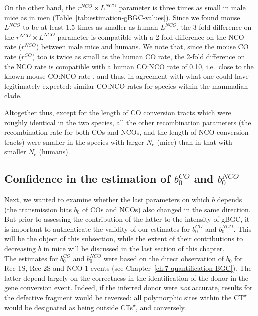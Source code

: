 On the other hand, the $r^{NCO} \times L^{NCO}$ parameter is three times as small in male mice as in men (Table~\ref{tab:estimation-gBGC-values}).
Since we found mouse $L^{NCO}$ to be at least 1.5 times as smaller as human $L^{NCO}$, the 3-fold difference on the $r^{NCO} \times L^{NCO}$ parameter is compatible with a 2-fold difference on the NCO rate ($r^{NCO}$) between male mice and humans.
We note that, since the mouse CO rate ($r^{CO}$) too is twice as small as the human CO rate, the 2-fold difference on the NCO rate is compatible with a human CO:NCO rate of 0.10, i.e.\ close to the known mouse CO:NCO rate \citep{cole2010comprehensive}, and thus, in agreement with what one could have legitimately expected: similar CO:NCO rates for species within the mammalian clade.

Altogether thus, except for the length of CO conversion tracts which were roughly identical in the two species, all the other recombination parameters (the recombination rate for both COs and NCOs, and the length of NCO conversion tracts) were smaller in the species with larger $N_e$ (mice) than in that with smaller $N_e$ (humans).






\subsection{Confidence in the estimation of $b_{0}^{CO}$ and $b_{0}^{NCO}$}

Next, we wanted to examine whether the last parameters on which $b$ depends (the transmission bias $b_0$ of COs and NCOs) also changed in the same direction.
But prior to assessing the contribution of the latter to the intensity of gBGC, it is important to authenticate the validity of our estimates for $b_{0}^{CO}$ and $b_{0}^{NCO}$.
This will be the object of this subsection, while the extent of their contributions to decreasing $b$ in mice will be discussed in the last section of this chapter.\\

The estimates for $b_{0}^{CO}$ and $b_{0}^{NCO}$ were based on the direct observation of $b_0$ for Rec-1S, Rec-2S and NCO-1 events (see Chapter~\ref{ch:7-quantification-BGC}).
The latter depend largely on the correctness in the identification of the donor in the gene conversion event.
Indeed, if the inferred donor were \textit{not} accurate, results for the defective fragment would be reversed: all polymorphic sites within the CT\textsuperscript{$\star$} would be designated as being outside CTs\textsuperscript{$\star$}, and conversely.

